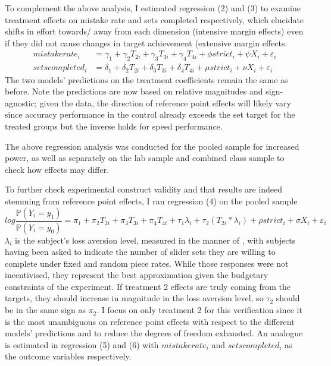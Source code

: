 \documentclass[12pt, letterpaper]{article}
\begin{document}
To complement the above analysis, I estimated regression (2) and (3) to examine treatment effects on mistake rate and sets completed respectively, which elucidate shifts in effort towards/ away from each dimension (intensive margin effects) even if they did not cause changes in target achievement (extensive margin effects.
\begin{align*}
mistakerate_i &= \gamma_1 + \gamma_2 T_{2i} + \gamma_3 T_{3i} + \gamma_4 T_{4i} + \phi strict_i + \psi X_i + \varepsilon_i \tag{2} \\
setscompleted_i &= \delta_1 + \delta_2 T_{2i} + \delta_3 T_{3i} + \delta_4 T_{4i} + \mu strict_i + \nu X_i + \varepsilon_i \tag{3}
\end{align*}
The two models' predictions on the treatment coefficients remain the same as before. Note the predictions are now based on relative magnitudes and sign-agnostic; given the data, the direction of reference point effects will likely vary since accuracy performance in the control already exceeds the set target for the treated groups but the inverse holds for speed performance.

The above regression analysis was conducted for the pooled sample for increased power, as well as separately on the lab sample and combined class sample to check how effects may differ.

To further check experimental construct validity and that results are indeed stemming from reference point effects, I ran regression (4) on the pooled sample
\[
log \frac {\mathbb{P}(Y_i = y_1)}{\mathbb{P}(Y_i = y_0)} = \pi_1 + \pi_2 T_{2i} + \pi_3 T_{3i} + \pi_4 T_{4i} + \tau_1 \lambda_i + \tau_2(T_{2i}*\lambda_i) + \rho strict_i + \sigma X_i + \varepsilon_i \tag{4}
\]
$\lambda_i$ is the subject's loss aversion level, measured in the manner of \textcite{campos-mercade.2024.gustibusdisputes}, with subjects having been asked to indicate the number of slider sets they are willing to complete under fixed and random piece rates. While those responses were not incentivised, they represent the best approximation given the budgetary constraints of the experiment. If treatment 2 effects are truly coming from the targets, they should increase in magnitude in the loss aversion level, so $\tau_2$ should be in the same sign as $\pi_2$. I focus on only treatment 2 for this verification since it is the most unambiguous on reference point effects with respect to the different models' predictions and to reduce the degrees of freedom exhausted. An analogue is estimated in regression (5) and (6) with $mistakerate_i$ and $setscompleted_i$ as the outcome variables respectively.
\end{document}
